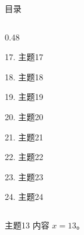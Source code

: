 \documentclass[aspectratio=169,10pt,fontset=fandol]{ctexbeamer}
\begin{document}
\begin{frame}[t,fragile]{目录}
\begin{columns}[T,onlytextwidth]
\begin{column}{0.48\textwidth}
{\color{gray!40}\small 17. 主题17\par}\vspace{0.22em}
{\color{gray!40}\small 18. 主题18\par}\vspace{0.22em}
{\color{gray!40}\small 19. 主题19\par}\vspace{0.22em}
{\color{gray!40}\small 20. 主题20\par}\vspace{0.22em}
{\color{gray!40}\small 21. 主题21\par}\vspace{0.22em}
{\color{gray!40}\small 22. 主题22\par}\vspace{0.22em}
{\color{gray!40}\small 23. 主题23\par}\vspace{0.22em}
{\color{gray!40}\small 24. 主题24\par}\vspace{0.22em}
\end{column}
\end{columns}
\end{frame}
\begin{frame}[t,fragile]{主题13}
\normalsize
{\normalsize
内容 $x=13$。
}
\end{frame}
\end{document}
